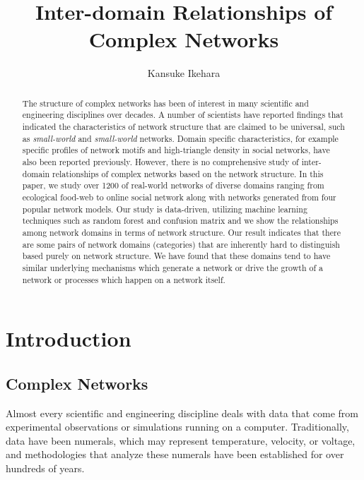 \documentclass{article}
\begin{document}
\title{Inter-domain Relationships of Complex Networks}
\author{Kansuke Ikehara}
\maketitle

\begin{abstract}
The structure of complex networks has been of interest in many scientific and engineering disciplines over decades. A number of scientists have reported findings that indicated the characteristics of network structure that are claimed to be universal, such as \textit{small-world} and \textit{small-world} networks. Domain specific characteristics, for example specific profiles of network motifs and high-triangle density in social networks, have also been reported previously. However, there is no comprehensive study of inter-domain relationships of complex networks based on the network structure. In this paper, we study over 1200 of real-world networks of diverse domains ranging from ecological food-web to online social network along with networks generated from four popular network models. Our study is data-driven, utilizing machine learning techniques such as random forest and confusion matrix and we show the relationships among network domains in terms of network structure. Our result indicates that there are some pairs of network domains (categories) that are inherently hard to distinguish based purely on network structure. We have found that these domains tend to have similar underlying mechanisms which generate a network or drive the growth of a network or processes which happen on a network itself.
  
\end{abstract}
\tableofcontents


\section{Introduction}
	\subsection{Complex Networks}
	Almost every scientific and engineering discipline deals with data that come from experimental observations or simulations running on a computer. Traditionally, data have been numerals, which may represent temperature, velocity, or voltage, and methodologies that analyze these numerals have been established for over hundreds of years. 
	
\end{document}
